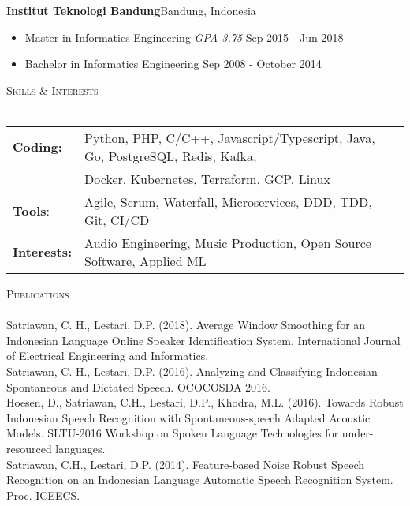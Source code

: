 \documentclass{article}
\newcommand{\lineunder} {
    \vspace*{-8pt} \\
    \hspace*{-18pt} \hrulefill \\
}
\newcommand{\header} [1] {
    {\hspace*{-18pt}\vspace*{6pt} \textsc{#1}}
    \vspace*{-6pt} \lineunder
}
\begin{document}
\textbf{Institut Teknologi Bandung}\hfill Bandung, Indonesia\\
\vspace{-3mm}
\begin{itemize}[align=left, left=0pt..1em, itemsep=-2pt]
  \item Master in Informatics Engineering \textit{GPA 3.75} \hfill Sep 2015 - Jun 2018
  \item Bachelor in Informatics Engineering \hfill Sep 2008 - October 2014
\end{itemize}

\header{Skills \& Interests}
\vspace{2mm}
\hspace{-4mm}
\begin{tabular}{ l l }
\textbf{Coding:} & Python, PHP, C/C++, Javascript/Typescript, Java, Go,
PostgreSQL, Redis, Kafka,\\
\vspace{1mm}
                 & Docker, Kubernetes, Terraform, GCP, Linux\\

\textbf{Tools}:
\vspace{1mm}
& Agile, Scrum, Waterfall, Microservices, DDD, TDD, Git, CI/CD \\

\textbf{Interests:}
\vspace{1mm}
& Audio Engineering, Music Production, Open Source Software, Applied ML\\

\end{tabular}
\vspace{2mm}

\header{Publications}
\vspace{1mm}
Satriawan, C. H., Lestari, D.P. (2018). Average Window Smoothing for an
Indonesian Language Online Speaker Identification System.
International Journal of Electrical Engineering and Informatics.\\
\vspace*{2mm}
Satriawan, C. H., Lestari, D.P. (2016). Analyzing and Classifying Indonesian Spontaneous and Dictated Speech. OCOCOSDA 2016.\\
\vspace*{2mm}
Hoesen, D., Satriawan, C.H., Lestari, D.P., Khodra, M.L. (2016). Towards Robust Indonesian Speech Recognition with Spontaneous-speech Adapted Acoustic Models.
SLTU-2016 Workshop on Spoken Language Technologies for under-resourced
languages.\\
\vspace*{2mm}
Satriawan, C.H., Lestari, D.P. (2014). Feature-based Noise Robust Speech Recognition on an Indonesian Language Automatic Speech Recognition System.
Proc. ICEECS.\\

\ 
\end{document}
